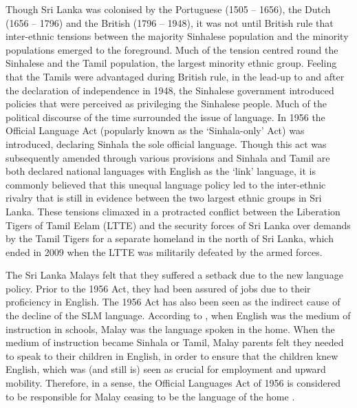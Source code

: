 Though Sri Lanka was colonised by the Portuguese (1505 -- 1656), the Dutch (1656 -- 1796) and the British (1796 -- 1948), it was not until British rule that inter-ethnic tensions between the majority Sinhalese population and the minority populations emerged to the foreground. Much of the tension centred round the Sinhalese and the Tamil population, the largest minority ethnic group. Feeling that the Tamils were advantaged during British rule, in the lead-up to and after the declaration of independence in 1948, the Sinhalese government introduced policies that were perceived as privileging the Sinhalese people. Much of the political discourse of the time surrounded the issue of language. In 1956 the Official Language Act (popularly known as the `Sinhala-only' Act) was introduced, declaring Sinhala the sole official language. Though this act was subsequently amended through various provisions and Sinhala and Tamil are both declared national languages with English as the `link' language, it is commonly believed that this unequal language policy led to the inter-ethnic rivalry that is still in evidence between the two largest ethnic groups in Sri Lanka. These tensions climaxed in a protracted conflict between the Liberation Tigers of Tamil Eelam (LTTE) and the security forces of Sri Lanka over demands by the Tamil Tigers for a separate homeland in the north of Sri Lanka, which ended in 2009 when the LTTE was militarily defeated by the armed forces. 

The Sri Lanka Malays felt that they suffered a setback due to the new language policy. Prior to the 1956 Act, they had been assured of jobs due to their proficiency in English. The 1956 Act has also been seen as the indirect cause of the decline of the SLM language. According to \citet{Saldin2001}, when English was the medium of instruction in schools, Malay was the language spoken in the home. When the medium of instruction became Sinhala or Tamil, Malay parents felt they needed to speak to their children in English, in order to ensure that the children knew English, which was (and still is) seen as crucial for employment and upward mobility. Therefore, in a sense, the Official Languages Act of 1956 is considered to be responsible for Malay ceasing to be the language of the home \citep{AnsaldoEtAl2006,Bichsel1989,LimEtAl2007,Saldin2001}. 

